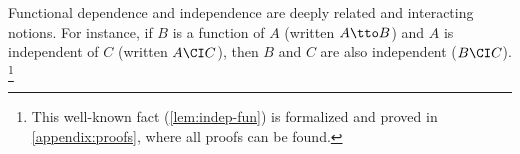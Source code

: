 Functional dependence and independence 
%
are deeply related and interacting notions.
For instance,
    if $B$ is a function of $A$ (written $A \tto B$) and $A$ is independent of $C$ (written $A \CI C$), then $B$ and $C$ are also independent ($B \CI C$).
\unskip\footnote{This well-known fact (\cref{lem:indep-fun}) is formalized
    and proved in \cref{appendix:proofs},
    where all proofs can be found.}
